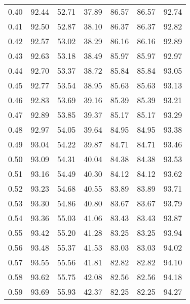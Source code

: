 \begin{tabular}{|c|c|c|c|c|c|c|}
      0.40 &     92.44 &     52.71 &      37.89 &   86.57 &      86.57 &         92.74 \\
      0.41 &     92.50 &     52.87 &      38.10 &   86.37 &      86.37 &         92.82 \\
      0.42 &     92.57 &     53.02 &      38.29 &   86.16 &      86.16 &         92.89 \\
      0.43 &     92.63 &     53.18 &      38.49 &   85.97 &      85.97 &         92.97 \\
      0.44 &     92.70 &     53.37 &      38.72 &   85.84 &      85.84 &         93.05 \\
      0.45 &     92.77 &     53.54 &      38.95 &   85.63 &      85.63 &         93.13 \\
      0.46 &     92.83 &     53.69 &      39.16 &   85.39 &      85.39 &         93.21 \\
      0.47 &     92.89 &     53.85 &      39.37 &   85.17 &      85.17 &         93.29 \\
      0.48 &     92.97 &     54.05 &      39.64 &   84.95 &      84.95 &         93.38 \\
      0.49 &     93.04 &     54.22 &      39.87 &   84.71 &      84.71 &         93.46 \\
      0.50 &     93.09 &     54.31 &      40.04 &   84.38 &      84.38 &         93.53 \\
      0.51 &     93.16 &     54.49 &      40.30 &   84.12 &      84.12 &         93.62 \\
      0.52 &     93.23 &     54.68 &      40.55 &   83.89 &      83.89 &         93.71 \\
      0.53 &     93.30 &     54.86 &      40.80 &   83.67 &      83.67 &         93.79 \\
      0.54 &     93.36 &     55.03 &      41.06 &   83.43 &      83.43 &         93.87 \\
      0.55 &     93.42 &     55.20 &      41.28 &   83.25 &      83.25 &         93.94 \\
      0.56 &     93.48 &     55.37 &      41.53 &   83.03 &      83.03 &         94.02 \\
      0.57 &     93.55 &     55.56 &      41.81 &   82.82 &      82.82 &         94.10 \\
      0.58 &     93.62 &     55.75 &      42.08 &   82.56 &      82.56 &         94.18 \\
      0.59 &     93.69 &     55.93 &      42.37 &   82.25 &      82.25 &         94.27 \\

\end{tabular}
